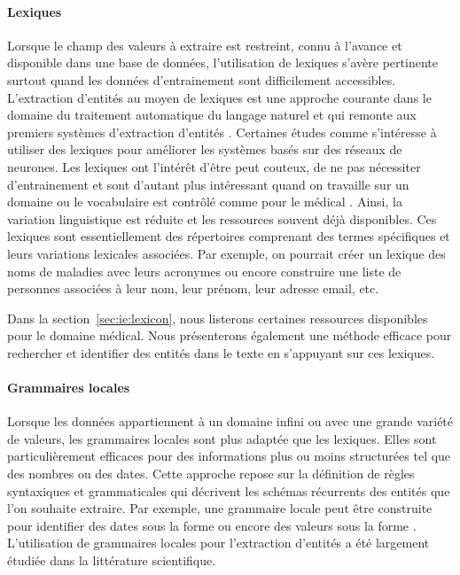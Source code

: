\paragraph{Lexiques}
Lorsque le champ des valeurs à extraire est restreint, connu à l'avance et disponible dans une base de données, l'utilisation de lexiques s'avère pertinente surtout quand les données d'entrainement sont difficilement accessibles.
L'extraction d'entités au moyen de lexiques est une approche courante dans le domaine du traitement automatique du langage naturel \cite{nasarNamedEntityRecognition2021} et qui remonte aux premiers systèmes d'extraction d'entités \cite{rauExtractingCompanyNames1991}.
Certaines études comme \cite{passosLexiconInfusedPhrase2014} s'intéresse à utiliser des lexiques pour améliorer les systèmes basés sur des réseaux de neurones.
Les lexiques ont l'intérêt d'être peut couteux, de ne pas nécessiter d'entrainement et sont d'autant plus intéressant quand on travaille sur un domaine ou le vocabulaire est contrôlé comme pour le médical \cite{camposBiomedicalNamedEntity2012}.
Ainsi, la variation linguistique est réduite et les ressources souvent déjà disponibles.
Ces lexiques sont essentiellement des répertoires comprenant des termes spécifiques et leurs variations lexicales associées.
Par exemple, on pourrait créer un lexique des noms de maladies avec leurs acronymes ou encore construire une liste de personnes associées à leur nom, leur prénom, leur adresse email, etc.

Dans la section~\ref{sec:ie:lexicon}, nous listerons certaines ressources disponibles pour le domaine médical.
Nous présenterons également une méthode efficace pour rechercher et identifier des entités dans le texte en s'appuyant sur ces lexiques.

\paragraph{Grammaires locales}
Lorsque les données appartiennent à un domaine infini ou avec une grande variété de valeurs, les grammaires locales sont plus adaptée que les lexiques.
Elles sont particulièrement efficaces pour des informations plus ou moins structurées tel que des nombres ou des dates.
Cette approche repose sur la définition de règles syntaxiques et grammaticales qui décrivent les schémas récurrents des entités que l'on souhaite extraire.
Par exemple, une grammaire locale peut être construite pour identifier des dates sous la forme  ou encore des valeurs sous la forme .
L'utilisation de grammaires locales pour l'extraction d'entités a été largement étudiée dans la littérature scientifique.

